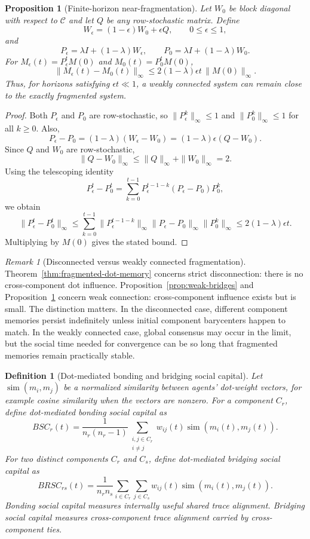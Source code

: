 \documentclass[11pt]{article}
\newtheorem{definition}{Definition}
\newtheorem{proposition}{Proposition}
\theoremstyle{remark}
\newtheorem{remark}{Remark}
\begin{document}
\begin{proposition}[Finite-horizon near-fragmentation]\label{prop:near-fragmentation}
Let $W_0$ be block diagonal with respect to $\mathcal{C}$ and let $Q$ be
any row-stochastic matrix. Define
$$
W_\epsilon=(1-\epsilon)W_0+\epsilon Q,
\qquad 0\leq\epsilon\leq1,
$$
and
$$
P_\epsilon=\lambda I+(1-\lambda)W_\epsilon,
\qquad
P_0=\lambda I+(1-\lambda)W_0.
$$
For $M_\epsilon(t)=P_\epsilon^tM(0)$ and $M_0(t)=P_0^tM(0)$,
$$
\|M_\epsilon(t)-M_0(t)\|_\infty
\leq 2(1-\lambda)\epsilon t\,\|M(0)\|_\infty.
$$
Thus, for horizons satisfying $\epsilon t\ll1$, a weakly connected
system can remain close to the exactly fragmented system.
\end{proposition}

\begin{proof}
Both $P_\epsilon$ and $P_0$ are row-stochastic, so
$\|P_\epsilon^k\|_\infty\leq1$ and $\|P_0^k\|_\infty\leq1$ for all
$k\geq0$. Also,
$$
P_\epsilon-P_0=(1-\lambda)(W_\epsilon-W_0)
=(1-\lambda)\epsilon(Q-W_0).
$$
Since $Q$ and $W_0$ are row-stochastic,
$$
\|Q-W_0\|_\infty\leq \|Q\|_\infty+\|W_0\|_\infty=2.
$$
Using the telescoping identity
$$
P_\epsilon^t-P_0^t
=
\sum_{k=0}^{t-1}P_\epsilon^{t-1-k}(P_\epsilon-P_0)P_0^k,
$$
we obtain
$$
\|P_\epsilon^t-P_0^t\|_\infty
\leq \sum_{k=0}^{t-1}
\|P_\epsilon^{t-1-k}\|_\infty
\|P_\epsilon-P_0\|_\infty
\|P_0^k\|_\infty
\leq 2(1-\lambda)\epsilon t.
$$
Multiplying by $M(0)$ gives the stated bound.
\end{proof}

\begin{remark}[Disconnected versus weakly connected fragmentation]
Theorem~\ref{thm:fragmented-dot-memory} concerns strict disconnection:
there is no cross-component dot influence. Proposition~\ref{prop:weak-bridges}
and Proposition~\ref{prop:near-fragmentation} concern weak connection:
cross-component influence exists but is small. The distinction matters.
In the disconnected case, different component memories persist
indefinitely unless initial component barycenters happen to match. In
the weakly connected case, global consensus may occur in the limit, but
the social time needed for convergence can be so long that fragmented
memories remain practically stable.
\end{remark}

\begin{definition}[Dot-mediated bonding and bridging social capital]
Let $\operatorname{sim}(m_i,m_j)$ be a normalized similarity between
agents' dot-weight vectors, for example cosine similarity when the
vectors are nonzero. For a component $C_r$, define dot-mediated bonding
social capital as
$$
BSC_r(t)=\frac{1}{n_r(n_r-1)}
\sum_{\substack{i,j\in C_r\\ i\neq j}}
 w_{ij}(t)\operatorname{sim}(m_i(t),m_j(t)).
$$
For two distinct components $C_r$ and $C_s$, define dot-mediated
bridging social capital as
$$
BRSC_{rs}(t)=\frac{1}{n_r n_s}
\sum_{i\in C_r}\sum_{j\in C_s}
 w_{ij}(t)\operatorname{sim}(m_i(t),m_j(t)).
$$
Bonding social capital measures internally useful shared trace
alignment. Bridging social capital measures cross-component trace
alignment carried by cross-component ties.
\end{definition}
\end{document}

